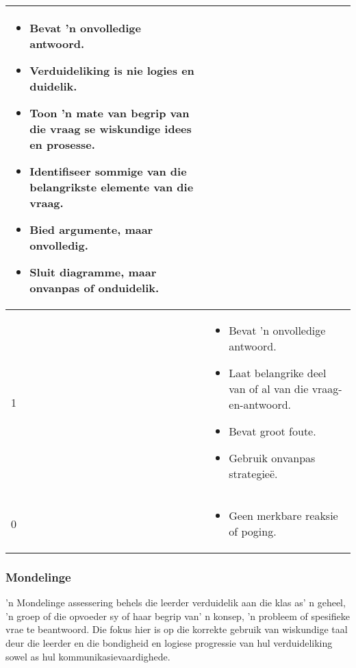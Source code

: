 \begin{table}[H]
\begin{center}
\begin{tabular}{|p{3cm}|p{8.5cm}|}
\begin{itemize}[noitemsep]
\item
  Bevat 'n onvolledige antwoord.
\item
  Verduideliking is nie logies en duidelik.
\item
  Toon 'n mate van begrip van die vraag se wiskundige idees en prosesse.
\item
  Identifiseer sommige van die belangrikste elemente van die vraag.
\item
  Bied argumente, maar onvolledig.
\item
  Sluit diagramme, maar onvanpas of onduidelik.
\end{itemize} \\ \hline
1 &
\begin{itemize}[noitemsep]
\item
  Bevat 'n onvolledige antwoord.
\item
  Laat belangrike deel van of al van die vraag-en-antwoord.
\item
  Bevat groot foute.
\item
  Gebruik onvanpas strategieë.
\end{itemize} \\ \hline
0 &
\begin{itemize}[noitemsep]
\item
Geen merkbare reaksie of poging.
\end{itemize} \\ \hline
  \end{tabular}

 \end{center}

\end{table}

\subsubsection{Mondelinge}
'n Mondelinge assessering behels die leerder verduidelik aan die klas as' n geheel, 'n groep of die opvoeder sy of haar begrip van' n konsep, 'n probleem of spesifieke vrae te beantwoord. Die fokus hier is op die korrekte gebruik van wiskundige taal deur die leerder en die bondigheid en logiese progressie van hul verduideliking sowel as hul kommunikasievaardighede.


